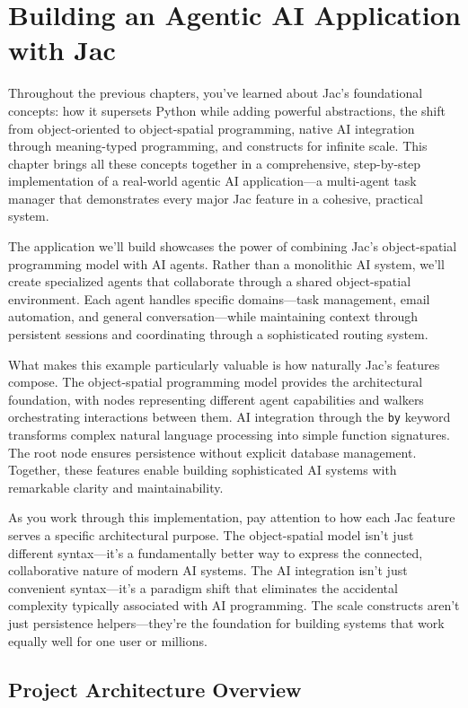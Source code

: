 \mtcaddchapter
\chapter{Building an Agentic AI Application with Jac}
\minitoc

Throughout the previous chapters, you've learned about Jac's foundational concepts: how it supersets Python while adding powerful abstractions, the shift from object-oriented to object-spatial programming, native AI integration through meaning-typed programming, and constructs for infinite scale. This chapter brings all these concepts together in a comprehensive, step-by-step implementation of a real-world agentic AI application—a multi-agent task manager that demonstrates every major Jac feature in a cohesive, practical system.

The application we'll build showcases the power of combining Jac's object-spatial programming model with AI agents. Rather than a monolithic AI system, we'll create specialized agents that collaborate through a shared object-spatial environment. Each agent handles specific domains—task management, email automation, and general conversation—while maintaining context through persistent sessions and coordinating through a sophisticated routing system.

What makes this example particularly valuable is how naturally Jac's features compose. The object-spatial programming model provides the architectural foundation, with nodes representing different agent capabilities and walkers orchestrating interactions between them. AI integration through the \texttt{by} keyword transforms complex natural language processing into simple function signatures. The root node ensures persistence without explicit database management. Together, these features enable building sophisticated AI systems with remarkable clarity and maintainability.

As you work through this implementation, pay attention to how each Jac feature serves a specific architectural purpose. The object-spatial model isn't just different syntax—it's a fundamentally better way to express the connected, collaborative nature of modern AI systems. The AI integration isn't just convenient syntax—it's a paradigm shift that eliminates the accidental complexity typically associated with AI programming. The scale constructs aren't just persistence helpers—they're the foundation for building systems that work equally well for one user or millions.

\section{Project Architecture Overview}

